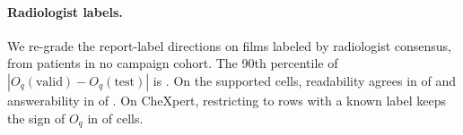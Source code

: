 \documentclass[11pt]{article}
\begin{document}
\begin{table}[tp]
\centering
\setlength{\tabcolsep}{3pt}
\caption{\textbf{The full grade under refitted probes.} For each seed-0 grade (owned, stronger competitor, advantage without the reference), $n$ counts its cells and the next columns count how many keep it under both refits, one, or none.}
\label{tab:cf-refit}
\end{table}


\paragraph{Radiologist labels.} We re-grade the report-label directions on \cfValidRows{} films labeled by radiologist consensus, from patients in no campaign cohort. The 90th percentile of $|O_q(\text{valid})-O_q(\text{test})|$ is \cfValidNinetyDO{}. On the \cfValidSupported{} supported cells, readability agrees in \cfValidReadableAgree{} of \cfValidReadableN{} and answerability in \cfValidAnswerAgree{} of \cfValidAnswerN{}. On CheXpert, restricting to rows with a known label keeps the sign of $O_q$ in \cfValKnownSignAgree{} of \cfValKnownN{} cells.
\end{document}

